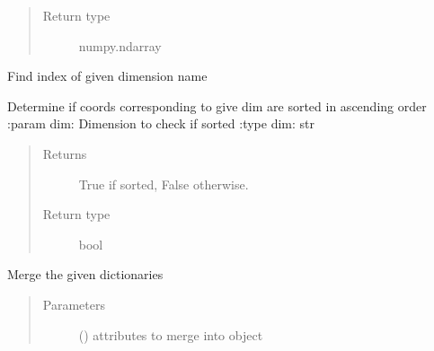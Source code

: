 \documentclass[letterpaper,10pt,english]{sphinxmanual}
\begin{document}
\begin{fulllineitems}
\begin{fulllineitems}
\begin{quote}
\begin{description}
\item[{Return type}] \leavevmode
numpy.ndarray

\end{description}\end{quote}

\end{fulllineitems}


\begin{fulllineitems}
\label{\detokenize{dnpData:dnpLab.dnpdata.index}}
Find index of given dimension name

\end{fulllineitems}


\begin{fulllineitems}
\label{\detokenize{dnpData:dnpLab.dnpdata.is_sorted}}
Determine if coords corresponding to give dim are sorted in ascending order
:param dim: Dimension to check if sorted
:type dim: str
\begin{quote}\begin{description}
\item[{Returns}] \leavevmode
True if sorted, False otherwise.

\item[{Return type}] \leavevmode
bool

\end{description}\end{quote}

\end{fulllineitems}


\begin{fulllineitems}
\label{\detokenize{dnpData:dnpLab.dnpdata.merge_attrs}}
Merge the given dictionaries
\begin{quote}\begin{description}
\item[{Parameters}] \leavevmode
{} () \sphinxhyphen{}\sphinxhyphen{} attributes to merge into object


\end{description}
\end{quote}
\end{fulllineitems}
\end{fulllineitems}
\end{document}
